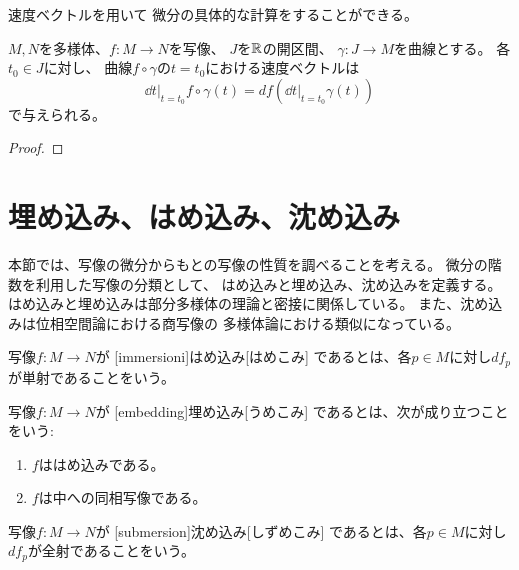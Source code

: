\documentclass[report]{jlreq}
\begin{document}
速度ベクトルを用いて
微分の具体的な計算をすることができる。

\begin{proposition}
    $M, N$を多様体、$f \colon M \to N$を{\smooth}写像、
    $J$を$\mathbb{R}$の開区間、
    $\gamma \colon J \to M$を{\smooth}曲線とする。
    各$t_0 \in J$に対し、
    曲線$f \circ \gamma$の$t = t_0$における速度ベクトルは
    \begin{equation}
        \dd{t}\bigg|_{t = t_0} f \circ \gamma (t)
            = df\left(\dd{t}\bigg|_{t = t_0} \gamma(t) \right)
    \end{equation}
    で与えられる。
\end{proposition}

\begin{proof}
    \TODO{}
\end{proof}


%
\section{埋め込み、はめ込み、沈め込み}

本節では、写像の微分からもとの写像の性質を調べることを考える。
微分の階数を利用した写像の分類として、
はめ込みと埋め込み、沈め込みを定義する。
はめ込みと埋め込みは部分多様体の理論と密接に関係している。
また、沈め込みは位相空間論における商写像の
多様体論における類似になっている。

\begin{definition}[はめ込み]
    {\smooth}写像$f \colon M \to N$が
    [immersioni]{はめ込み}[はめこみ]
    であるとは、各$p \in M$に対し$df_p$が単射であることをいう。
\end{definition}

\begin{definition}[埋め込み]
    {\smooth}写像$f \colon M \to N$が
    [embedding]{埋め込み}[うめこみ]
    であるとは、次が成り立つことをいう:
    \begin{enumerate}
        \item $f$ははめ込みである。
        \item $f$は中への同相写像である。
    \end{enumerate}
\end{definition}

\begin{definition}[沈め込み]
    {\smooth}写像$f \colon M \to N$が
    [submersion]{沈め込み}[しずめこみ]
    であるとは、各$p \in M$に対し$df_p$が全射であることをいう。
\end{definition}
\end{document}
